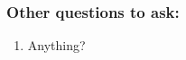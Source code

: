 \documentclass[12pt, addpoints]{exam}
\begin{document}
\ifprintanswers

\newpage

\subsubsection*{Other questions to ask:}

\begin{enumerate}[label=\alph*.]

	\item Anything?
	
\end{enumerate}

\fi
\end{document}
